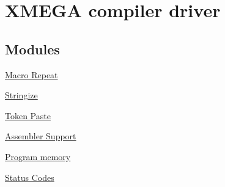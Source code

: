 \hypertarget{group__group__xmega__utils}{\section{X\-M\-E\-G\-A compiler driver}
\label{group__group__xmega__utils}
}
\subsection*{Modules}
\begin{DoxyCompactItemize}
\item 
\hyperlink{group__group__xmega__utils__mrepeat}{Macro Repeat}
\item 
\hyperlink{group__group__xmega__utils__stringz}{Stringize}
\item 
\hyperlink{group__group__xmega__utils__tpaste}{Token Paste}
\item 
\hyperlink{group__assembler__group}{Assembler Support}
\item 
\hyperlink{group__group__xmega__utils__progmem}{Program memory}
\item 
\hyperlink{group__group__xmega__utils__status__codes}{Status Codes}
\end{DoxyCompactItemize}
